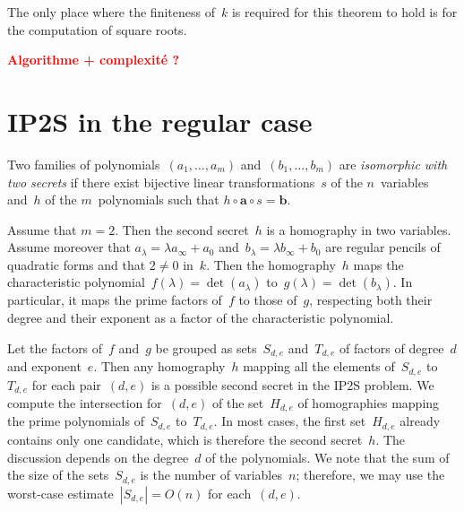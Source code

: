 \documentclass{lms}%
\def\abs#1{\left|#1\right|}
\def\card#1{\abs{#1}}
\def\commentaire#1{{\bfseries\textcolor{red}{#1}}}
\begin{document}
The only place where the finiteness of~$k$ is required for this theorem
to hold is for the computation of square roots.

\commentaire{Algorithme + complexité ?}

\section{IP2S in the regular case}%
\label{S:IP2S-regular}
Two families of polynomials~$(a_1,…,a_m)$ and~$(b_1,…,b_m)$ are
\emph{isomorphic with two secrets} if there exist bijective linear
transformations~$s$ of the $n$~variables and~$h$ of the $m$~polynomials
such that $h ∘ \bm{a} ∘ s = \bm{b}$.

Assume that $m = 2$. Then the second secret~$h$ is a homography in two
variables. Assume moreover that $a_{λ} = λ a_∞ + a_0$ and~$b_{λ} = λ
b_{∞} + b_0$ are regular pencils of quadratic forms and that $2≠ 0$
in~$k$. Then the homography~$h$ maps the characteristic polynomial~$f(λ)
= \det (a_{λ})$ to~$g(λ) = \det (b_{λ})$. In particular, it maps the
prime factors of~$f$ to those of~$g$, respecting both their degree and
their exponent as a factor of the characteristic polynomial.

Let the factors of~$f$ and~$g$ be grouped as sets~$S_{d,e}$ and~$T_{d,e}$
of factors of degree~$d$ and exponent~$e$. Then any homography~$h$
mapping all the elements of~$S_{d,e}$ to~$T_{d,e}$ for each pair~$(d,e)$
is a possible second secret in the IP2S problem. We compute the
intersection for~$(d,e)$ of the set~$H_{d,e}$ of homographies mapping the
prime polynomials of~$S_{d,e}$ to~$T_{d,e}$. In most cases, the first
set~$H_{d,e}$ already contains only one candidate, which is therefore the
second secret~$h$. The discussion depends on the degree~$d$ of the
polynomials. We note that the sum of the size of the sets~$S_{d,e}$ is
the number of variables~$n$; therefore, we may use the worst-case
estimate~$\card{S_{d,e}} = O(n)$ for each~$(d,e)$.
\end{document}
